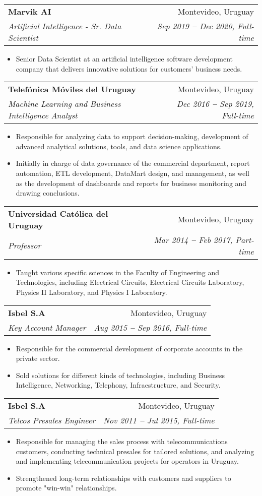 \documentclass[letterpaper,11pt]{article}
\makeatletter
\newcommand{\resumeItem}[1]{
  \item\small{
    {#1 \vspace{-2pt}}
  }
}
\newcommand{\resumeSubheading}[4]{
  \vspace{-2pt}\item
  \begin{tabular*}{0.97\textwidth}[t]{l@{\extracolsep{\fill}}r}
    \textbf{#1} & #2 \\
    \textit{\small#3} & \textit{\small #4} \\
  \end{tabular*}\vspace{-7pt}
}
\newcommand{\resumeItemListStart}{\begin{itemize}}
\newcommand{\resumeItemListEnd}{\end{itemize}\vspace{-5pt}}
\makeatother
\begin{document}
        \resumeSubheading
            {Marvik AI}{Montevideo, Uruguay}
            {Artificial Intelligence - Sr. Data Scientist}{Sep 2019 \textbf{--} Dec 2020, Full-time}
            \resumeItemListStart
                \resumeItem{Senior Data Scientist at an artificial intelligence software development company that delivers innovative solutions for customers' business needs.}
            \resumeItemListEnd

        \resumeSubheading
            {Telefónica Móviles del Uruguay}{Montevideo, Uruguay}
            {Machine Learning and Business Intelligence Analyst}{Dec 2016 \textbf{--} Sep 2019, Full-time}
            \resumeItemListStart
                \resumeItem{Responsible for analyzing data to support decision-making, development of advanced analytical solutions, tools, and data science applications.}
                \resumeItem{Initially in charge of data governance of the commercial department, report automation, ETL development, DataMart design, and management, as well as the development of dashboards and reports for business monitoring and drawing conclusions.}
            \resumeItemListEnd

        \resumeSubheading
            {Universidad Católica del Uruguay}{Montevideo, Uruguay}
            {Professor}{Mar 2014 \textbf{--} Feb 2017, Part-time}
            \resumeItemListStart
                \resumeItem{Taught various specific sciences in the Faculty of Engineering and Technologies, including Electrical Circuits, Electrical Circuits Laboratory, Physics II Laboratory, and Physics I Laboratory.}
            \resumeItemListEnd
        
        \resumeSubheading
            {Isbel S.A}{Montevideo, Uruguay}
            {Key Account Manager}{Aug 2015 \textbf{--} Sep 2016, Full-time}
            \resumeItemListStart
                \resumeItem{ Responsible for the commercial development of corporate accounts in the private sector.}
                \resumeItem{Sold solutions for different kinds of technologies, including Business Intelligence, Networking, Telephony, Infraestructure, and Security.}
            \resumeItemListEnd

        \resumeSubheading
            {Isbel S.A}{Montevideo, Uruguay}
            {Telcos Presales Engineer}{Nov 2011 \textbf{--} Jul 2015, Full-time}
            \resumeItemListStart
                \resumeItem{Responsible for managing the sales process with telecommunications customers, conducting technical presales for tailored solutions, and analyzing and implementing telecommunication projects for operators in Uruguay.}
                \resumeItem{Strengthened long-term relationships with customers and suppliers to promote "win-win" relationships.}
            \resumeItemListEnd
    
\end{document}
